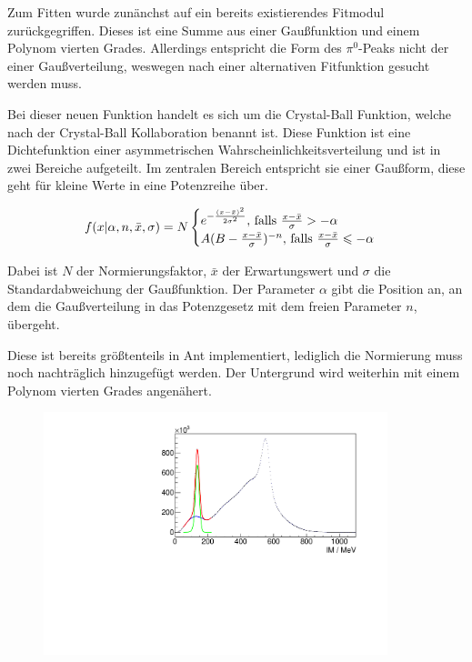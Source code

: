 \documentclass[a4paper,11pt,oneside,final,german,openbib,pdftex]{scrbook}
\begin{document}
{Zum Fitten wurde zun\"anchst auf ein bereits existierendes Fitmodul zur\"uckgegriffen. Dieses ist eine Summe aus einer Gau{\ss}funktion und einem Polynom vierten Grades. Allerdings entspricht die Form des $\pi^0$-Peaks nicht der einer Gau{\ss}verteilung, weswegen nach einer alternativen Fitfunktion gesucht werden muss. 

Bei dieser neuen Funktion handelt es sich um die Crystal-Ball Funktion, welche nach der Crystal-Ball Kollaboration benannt ist. Diese Funktion ist eine Dichtefunktion einer asymmetrischen Wahrscheinlichkeitsverteilung und ist in zwei Bereiche aufgeteilt. Im zentralen Bereich entspricht sie einer Gau{\ss}form, diese geht f\"ur kleine Werte in eine Potenzreihe \"uber.

\begin{equation}
f(x|\alpha,n,\bar{x},\sigma)=N\begin{cases}e^{-\frac{(x-\bar{x})^2}{2\sigma^2}}, \,\textnormal{falls $\frac{x-\bar{x}}{\sigma}> -\alpha$} \\
A(B-\frac{x-\bar{x}}{\sigma})^{-n},\, \textnormal{falls $\frac{x-\bar{x}}{\sigma}\leqslant -\alpha$} 
\end{cases}
\label{eq:Crystal-Ball-Funktion}
\end{equation}

Dabei ist $N$ der Normierungsfaktor, $\bar{x}$ der Erwartungswert und $\sigma$ die Standardabweichung der Gau{\ss}funktion. Der Parameter $\alpha$ gibt die Position an, an dem die Gau{\ss}verteilung in das Potenzgesetz mit dem freien Parameter $n$, \"ubergeht\cite{Ce15}.



Diese ist bereits gr\"o{\ss}tenteils in Ant implementiert, lediglich die Normierung muss noch nachtr\"aglich hinzugef\"ugt werden.
Der Untergrund wird weiterhin mit einem Polynom vierten Grades angen\"ahert.

\begin{figure}[h!]
	\begin{center}
		\includegraphics[width=100mm]{NewCalib/Strahlzeit2014/20171904RealIntervalFitExample}
		

\end{center}
\end{figure}}
\end{document}
